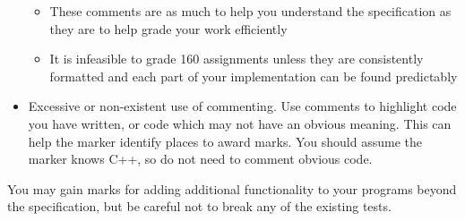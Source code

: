 \documentclass[a4paper]{article}
\begin{document}
\begin{itemize}
        \begin{itemize}
            \item These comments are as much to help you understand the specification as they are to help grade your work efficiently
            \item It is infeasible to grade 160 assignments unless they are consistently formatted and each part of your implementation can be found predictably
    \end{itemize}

    \item Excessive or non-existent use of commenting. Use comments to highlight code you have written, or code which may not have an obvious meaning. This can help the marker identify places to award marks. You should assume the marker knows C++, so do not need to comment obvious code.
\end{itemize}

You may gain marks for adding additional functionality to your programs beyond the specification, but be careful not to break any of the existing tests.
\end{document}

